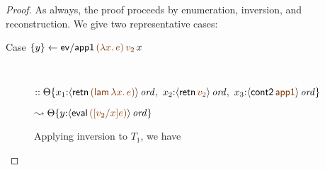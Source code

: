 \begin{proof} As always, the proof proceeds by enumeration, inversion,
  and reconstruction. We give two representative cases: 

\begin{description}

\item 
  [Case $\trstep{y}{{\sf ev/app1}\,\lf{(\lambda x.\,e)}\,\lf{v_2}\,x}$]~

\qquad
  $::
   \tackon{\Theta}{x_1{:}\istrue{\susp{{\sf retn}\,\lf{({\sf lam}\,\lambda x.\,e)}}}, ~
                   x_2{:}\istrue{\susp{{\sf retn}\,\lf{v_2}}}, ~
                   x_3{:}\istrue{\susp{{\sf cont2}\,\lf{\sf app1}}}}$

\qquad\qquad
  $\leadsto
   \tackon{\Theta}{y{:}\istrue{\susp{{\sf eval}\,\lf{([v_2/x]e)}}}}$

\medskip
Applying inversion to $T_1$, we have


\end{description}
\end{proof}
